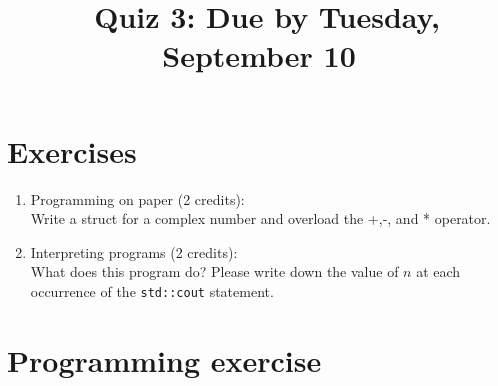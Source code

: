 \documentclass[11pt]{article}
\begin{document}
\title{\coursename~Quiz 3: Due by Tuesday, September 10}
\date{}
\maketitle

\medskip


\section*{Exercises}

\begin{enumerate}
\item Programming on paper (2 credits): \\
Write a struct for a complex number and overload the +,-, and * operator.

\item Interpreting programs (2 credits): \\
What does this program do? Please write down the value of $n$ at each occurrence of the \lstinline|std::cout| statement.



\end{enumerate}

\section*{Programming exercise}
\end{document}
